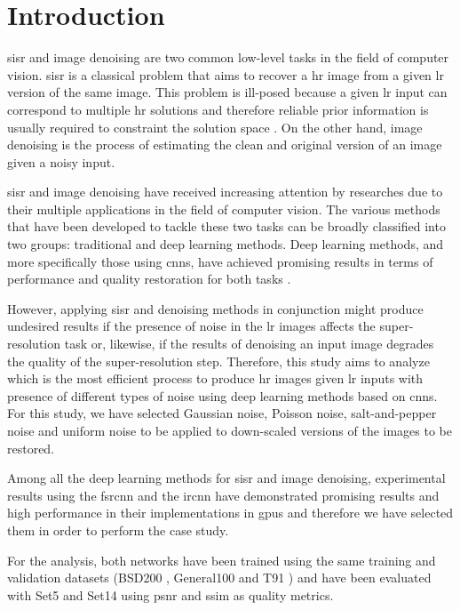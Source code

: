 \section{Introduction}

\Gls{sisr} and image denoising are two common low-level tasks in the field of computer vision. \Gls{sisr} is a classical problem that aims to recover a \gls{hr} image from a given \gls{lr} version of the same image. This problem is ill-posed because a given \gls{lr} input can correspond to multiple \gls{hr} solutions and therefore reliable prior information is usually required to constraint the solution space \cite{DBLP:SISR} \cite{SRCNN} \cite{DBLP:DEEPSISR}. On the other hand, image denoising is the process of estimating the clean and original version of an image given a noisy input.

\gls{sisr} and image denoising have received increasing attention by researches due to their multiple applications in the field of computer vision. The various methods that have been developed to tackle these two tasks can be broadly classified into two groups: traditional and deep learning methods. Deep learning methods, and more specifically those using \glspl{cnn}, have achieved promising results in terms of performance and quality restoration for both tasks \cite{DBLP:DEEPNR} \cite{DBLP:DEEPSISR}.

However, applying \gls{sisr} and denoising methods in conjunction might produce undesired results if the presence of noise in the \gls{lr} images affects the super-resolution task or, likewise, if the results of denoising an input image degrades the quality of the super-resolution step. Therefore, this study aims to analyze which is the most efficient process to produce \gls{hr} images given \gls{lr} inputs with presence of different types of noise using deep learning methods based on \glspl{cnn}. For this study, we have selected Gaussian noise, Poisson noise, salt-and-pepper noise and uniform noise to be applied to down-scaled versions of the images to be restored.

Among all the deep learning methods for \gls{sisr} and image denoising, experimental results using the \gls{fsrcnn} \cite{FSRCNN} and the \gls{ircnn} \cite{IRCNN} have demonstrated promising results and high performance in their implementations in \glspl{gpu} and therefore we have selected them in order to perform the case study.

For the analysis, both networks have been trained using the same training and validation datasets (BSD200 \cite{BSDS}, General100 \cite{FSRCNN} and T91 \cite{T91}) and have been evaluated with Set5 \cite{SET5} and Set14 \cite{SET14} using \gls{psnr} and \gls{ssim} as quality metrics.

